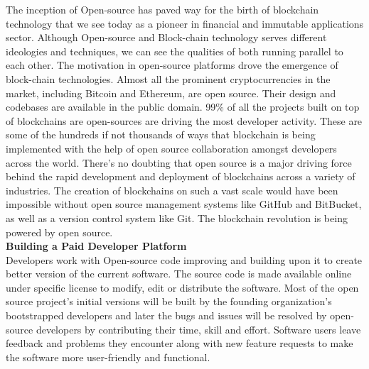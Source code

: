 \documentclass[conference]{IEEEtran}
\begin{document}
The inception of Open-source has paved way for the birth of blockchain technology that we see today as a pioneer in financial and immutable applications sector. Although Open-source and Block-chain technology serves different ideologies and techniques, we can see the qualities of both running parallel to each other. The motivation in open-source platforms drove the emergence of block-chain technologies. Almost all the prominent cryptocurrencies in the market, including Bitcoin and Ethereum, are open source. Their design and codebases are available in the public domain. 99\% of all the projects built on top of blockchains are open-sources are driving the most developer activity. These are some of the hundreds if not thousands of ways that blockchain is being implemented with the help of open source collaboration amongst developers across the world. There’s no doubting that open source is a major driving force behind the rapid development and deployment of blockchains across a variety of industries. The creation of blockchains on such a vast scale would have been impossible without open source management systems like GitHub and BitBucket, as well as a version control system like Git. The blockchain revolution is being powered by open source.\\

\textbf{Building a Paid Developer Platform}\\

Developers work with Open-source code improving and building upon it to create better version of the current software. The source code is made available online under specific license to modify, edit or distribute the software. Most of the open source project's initial versions will be built by the founding organization's bootstrapped developers and later the bugs and issues will be resolved by open-source developers by contributing their time, skill and effort. Software users leave feedback and problems they encounter along with new feature requests to make the software more user-friendly and functional.\\ 
\end{document}
